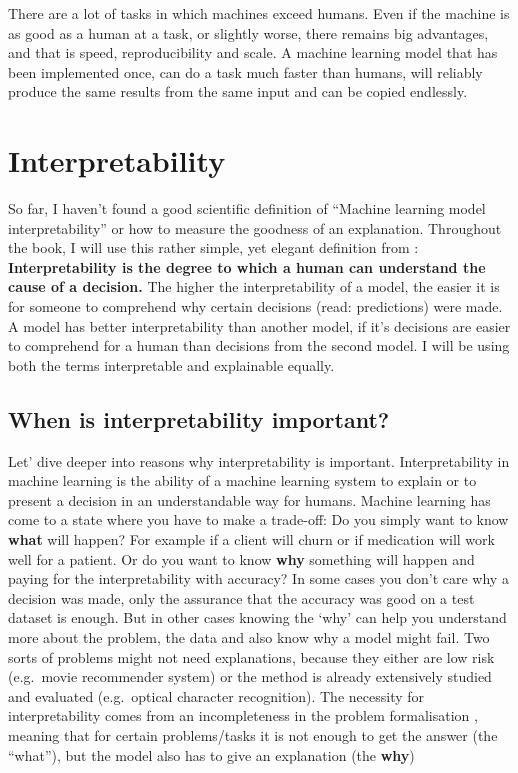 \documentclass[12pt,]{krantz}
\theoremstyle{definition}
\theoremstyle{definition}
\theoremstyle{definition}
\theoremstyle{remark}
\begin{document}
There are a lot of tasks in which machines exceed humans. Even if the
machine is as good as a human at a task, or slightly worse, there
remains big advantages, and that is speed, reproducibility and scale. A
machine learning model that has been implemented once, can do a task
much faster than humans, will reliably produce the same results from the
same input and can be copied endlessly.

\chapter{Interpretability}\label{interpretability}

So far, I haven't found a good scientific definition of ``Machine
learning model interpretability'' or how to measure the goodness of an
explanation. Throughout the book, I will use this rather simple, yet
elegant definition from \citet{miller2017explanation}:
\textbf{Interpretability is the degree to which a human can understand the cause of a decision.}
The higher the interpretability of a model, the easier it is for someone
to comprehend why certain decisions (read: predictions) were made. A
model has better interpretability than another model, if it's decisions
are easier to comprehend for a human than decisions from the second
model. I will be using both the terms interpretable and explainable
equally.

\section{When is interpretability
important?}\label{when-is-interpretability-important}

Let' dive deeper into reasons why interpretability is important.
Interpretability in machine learning is the ability of a machine
learning system to explain or to present a decision in an understandable
way for humans. Machine learning has come to a state where you have to
make a trade-off: Do you simply want to know \textbf{what} will happen?
For example if a client will churn or if medication will work well for a
patient. Or do you want to know \textbf{why} something will happen and
paying for the interpretability with accuracy? In some cases you don't
care why a decision was made, only the assurance that the accuracy was
good on a test dataset is enough. But in other cases knowing the `why'
can help you understand more about the problem, the data and also know
why a model might fail. Two sorts of problems might not need
explanations, because they either are low risk (e.g.~movie recommender
system) or the method is already extensively studied and evaluated
(e.g.~optical character recognition). The necessity for interpretability
comes from an incompleteness in the problem formalisation
\citep{Doshi-Velez2017}, meaning that for certain problems/tasks it is
not enough to get the answer (the ``what''), but the model also has to
give an explanation (the \textbf{why})
\end{document}
